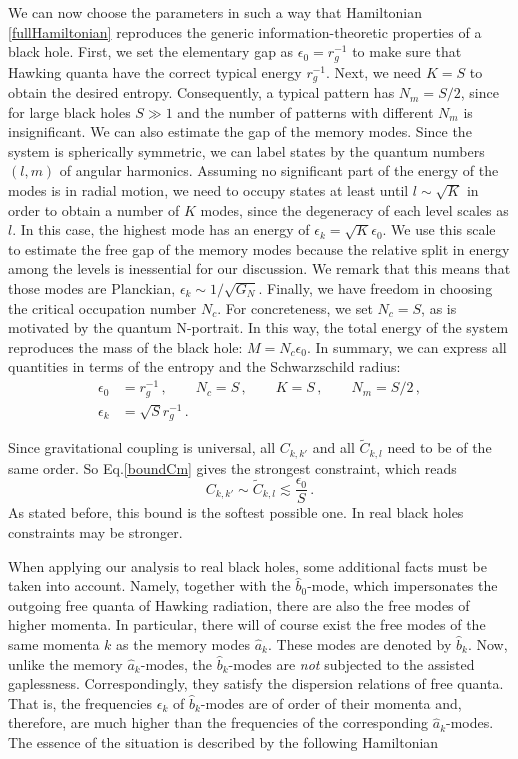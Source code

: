 \documentclass[aps,prd,reprint,superscriptaddress,nofootinbib]{revtex4-2}
\makeatletter
\newcommand*{\Eq}{Eq.\@\xspace}
\makeatother
\begin{document}
We can now choose the parameters in such a way that Hamiltonian \eqref{fullHamiltonian} reproduces the generic information-theoretic properties of 
a black hole. First, we set the elementary gap as $\epsilon_0=r_g^{-1}$ 
to make sure that Hawking quanta have the correct typical energy $r_g^{-1}$. Next, we need $K=S$ to obtain the desired entropy. Consequently, a typical pattern has $N_m=S/2$, since for large black holes $S\gg 1$ and 
the number of patterns with different $N_m$ is insignificant.
We can also estimate the gap of the memory modes. 
Since the system is spherically symmetric, we can label states by the quantum numbers $(l,m)$ of angular harmonics. Assuming no significant part of the energy of the modes is in radial motion, we need to occupy states at least until $l\sim \sqrt{K}$ in order to obtain a number of $K$ modes, since the degeneracy of each level scales as $l$. In this case, the highest mode has an energy of $\epsilon_k=\sqrt{K} \epsilon_0$. We use this scale to estimate the free gap of the memory modes because the relative split in energy among the levels is inessential for our discussion. We remark that this means that those modes are Planckian, $\epsilon_k \sim 1/\sqrt{G_N}$. Finally, we have freedom in choosing the critical occupation number $N_c$. For concreteness, we set $N_c=S$, as is motivated by the quantum N-portrait.
In this way, the total energy of the system reproduces the mass of the black hole: $M = N_c \epsilon_0$. 
In summary, we can express all quantities in terms of the entropy and the 
Schwarzschild radius:
\begin{align} \label{parametersBH}
\epsilon_0 &=r_g^{-1} \,, \qquad N_c=S\,, \qquad K=S\,,\qquad N_m=S/2\,,
\nonumber \\ 
\epsilon_k &= \sqrt{S} r_g^{-1} \,.
\end{align}

Since gravitational coupling is universal, all $C_{k,k'}$ and all $\tilde{C}_{k,l}$ need to be of the same order. So \Eq \eqref{boundCm} gives the 
strongest constraint, which reads
\begin{equation} \label{boundCmBH}
C_{k,k'} \sim \tilde{C}_{k,l} \lesssim \frac{\epsilon_0}{S} \,.
\end{equation}
As stated before, this bound is the softest possible one. In real black holes constraints may be stronger. 


When applying our analysis to real black holes, 
some additional facts must be taken into account.
Namely, together with the $\hat{b}_0$-mode, which impersonates the outgoing 
free quanta of Hawking radiation, there are also the free modes of higher 
momenta. In particular, there will of course exist  
the free modes of the same momenta $k$ as the memory modes  
$\hat{a}_k$.  These modes are denoted by  $\hat{b}_k$. 
Now, unlike the memory $\hat{a}_k$-modes, the  $\hat{b}_k$-modes are 
{\it not} subjected to the assisted gaplessness. Correspondingly,  they satisfy the dispersion relations of free quanta.  
 That is, the frequencies $\epsilon_k$ of 
 $\hat{b}_k$-modes are of order of their momenta and, therefore, are much 
higher than the frequencies of the corresponding 
 $\hat{a}_k$-modes.  The essence of the situation is described by the following Hamiltonian  
   
\end{document}
